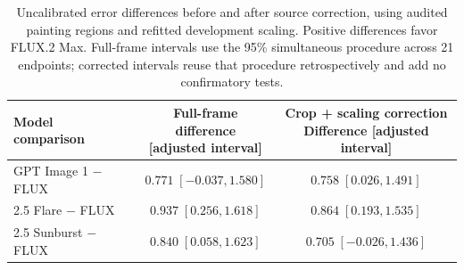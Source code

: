 \begin{table}[!htbp]\centering\small
\begin{tabularx}{\linewidth}{@{}Xcc@{}}\toprule
Model comparison & \shortstack{Full-frame difference\\{[adjusted interval]}} & \shortstack{Crop + scaling correction\\Difference [adjusted interval]}\\\midrule
GPT Image 1 $-$ FLUX & $0.771\;[-0.037,1.580]$ & $0.758\;[0.026,1.491]$\\[2pt]
2.5 Flare $-$ FLUX & $0.937\;[0.256,1.618]$ & $0.864\;[0.193,1.535]$\\[2pt]
2.5 Sunburst $-$ FLUX & $0.840\;[0.058,1.623]$ & $0.705\;[-0.026,1.436]$\\[2pt]
\bottomrule\end{tabularx}
\caption{Uncalibrated error differences before and after source correction, using audited painting regions and refitted development scaling. Positive differences favor FLUX.2 Max. Full-frame intervals use the 95\% simultaneous procedure across 21 endpoints; corrected intervals reuse that procedure retrospectively and add no confirmatory tests.}
\label{tab:source-comparison}\end{table}

